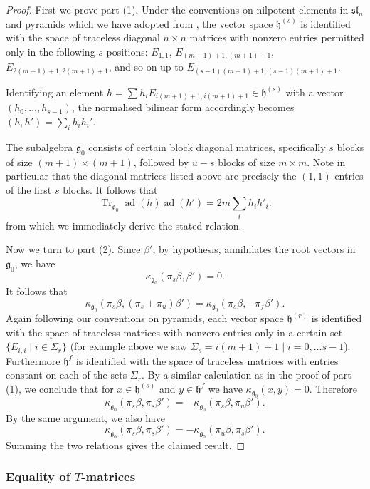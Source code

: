 \documentclass[12pt]{amsart}
\theoremstyle{plain}
\theoremstyle{definition}
\numberwithin{equation}{section}
\DeclareMathOperator{\ad}{ad}
\DeclareMathOperator{\tr}{Tr}
\newcommand{\g}{\mathfrak{g}}
\newcommand{\h}{\mathfrak{h}}
\newcommand{\sll}{\mathfrak{sl}}
\begin{document}
\begin{proof}
First we prove part (1). Under the conventions on nilpotent elements in $\sll_n$ and pyramids which we have adopted from \cite{CMcG}, the vector space $\h^{(s)}$ is identified with the space of traceless diagonal $n \times n$ matrices with nonzero entries permitted only in the following $s$ positions: $E_{1, 1}$, $E_{(m+1)+1, (m+1)+1}$, $E_{2(m+1)+1, 2(m+1)+1}$, and so on up to $E_{(s-1)(m+1)+1, (s-1)(m+1)+1}$.


Identifying an element $h = \sum h_i E_{i(m+1)+1, i(m+1)+1} \in \h^{(s)}$ with a vector $(h_0, \ldots, h_{s-1})$, the normalised bilinear form accordingly becomes $(h, h') = \sum_i h_i h_i'$.

The subalgebra $\g_0$ consists of certain block diagonal matrices, specifically $s$ blocks of size $(m+1) \times (m+1)$, followed by $u-s$ blocks of size $m \times m$. Note in particular that the diagonal matrices listed above are precisely the $(1, 1)$-entries of the first $s$ blocks. It follows that
\[
\tr_{\g_0} \ad(h) \ad(h') = 2 m \sum_{i} h_i h'_i.
\]
from which we immediately derive the stated relation.

Now we turn to part (2).  Since $\beta'$, by hypothesis, annihilates the root vectors in $\g_0$, we have
\[
\kappa_{\g_0}(\pi_s\beta, \beta') = 0.
\]
It follows that
\[
\kappa_{\g_0}(\pi_s\beta, (\pi_s+\pi_u)\beta') = \kappa_{\g_0}(\pi_s\beta, -\pi_f\beta').
\]
Again following our conventions on pyramids, each vector space $\h^{(r)}$ is identified with the space of traceless matrices with nonzero entries only in a certain set $\{E_{i, i} \mid i \in \Sigma_r\}$ (for example above we saw $\Sigma_s = {i(m+1)+1 \mid i=0,\ldots s-1}$). Furthermore $\h^f$ is identified with the space of traceless matrices with entries constant on each of the sets $\Sigma_r$. By a similar calculation as in the proof of part (1), we conclude that for $x \in \h^{(s)}$ and $y \in \h^f$ we have $\kappa_{\g_0}(x, y) = 0$. Therefore
\[
\kappa_{\g_0}(\pi_s\beta, \pi_s\beta') = -\kappa_{\g_0}(\pi_s\beta, \pi_u\beta').
\]
By the same argument, we also have
\[
\kappa_{\g_0}(\pi_s\beta, \pi_s\beta') = -\kappa_{\g_0}(\pi_u\beta, \pi_s\beta').
\]
Summing the two relations gives the claimed result.
\end{proof}




\subsubsection{Equality of $T$-matrices}\label{subsec:T-matrices}
\end{document}
